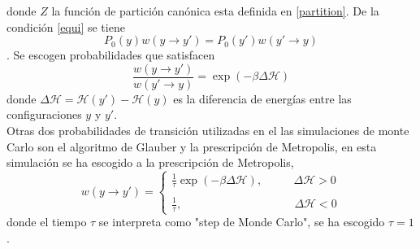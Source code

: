 \documentclass[a4paper]{article}
\begin{document}
donde $Z$ la función de partición canónica esta definida en \ref{partition}. De la condición \ref{equi} se tiene
\begin{equation}
P_0(y)w(y\rightarrow y')=P_0(y')w(y'\rightarrow y)
\end{equation}.
Se escogen probabilidades  que satisfacen 
\begin{equation}\label{probTans1}
\frac{w(y\rightarrow y')}{w(y'\rightarrow y)}=\exp (-\beta \Delta \mathcal{H})
\end{equation}
donde $\Delta\mathcal{H}=\mathcal{H}(y')-\mathcal{H}(y)$ es la diferencia de energías entre las configuraciones $y$ y $y'$.\\
Otras dos probabilidades de transición utilizadas en el las simulaciones de monte Carlo son el algoritmo de Glauber y la prescripción de Metropolis, en esta simulación se ha escogido a la prescripción de Metropolis,
\begin{equation}
w(y\rightarrow y')=\left\{
        \begin{array}{ll}
            \frac{1}{\tau}\exp (-\beta \Delta \mathcal{H}), & \quad\;\,\,\,\, \Delta\mathcal{H}> 0 \\\\
            \frac{1}{\tau}, & \quad\quad \Delta\mathcal{H}< 0
        \end{array}
    \right.
\end{equation}
donde el tiempo $\tau$ se interpreta como "step de Monde Carlo", se ha escogido $\tau=1$.
\end{document}
